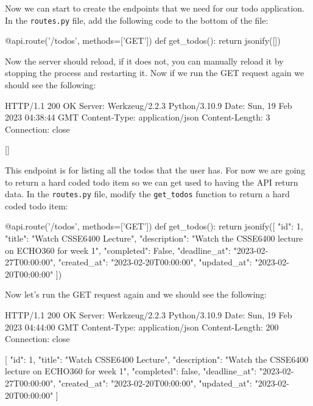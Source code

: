 \documentclass{csse4400}
\begin{document}
Now we can start to create the endpoints that we need for our todo application. In the \texttt{routes.py} file, add the following code to the bottom of the file:

\begin{code}[language=python]{}
  @api.route('/todos', methods=['GET'])
  def get_todos():
      return jsonify([])
\end{code}

Now the server should reload, if it does not, you can manually reload it by stopping the process and restarting it. Now if we run the GET request again we should see the following:

\begin{code}[language=json,numbers=none]{}
  HTTP/1.1 200 OK
  Server: Werkzeug/2.2.3 Python/3.10.9
  Date: Sun, 19 Feb 2023 04:38:44 GMT
  Content-Type: application/json
  Content-Length: 3
  Connection: close
  
  []
\end{code}

This endpoint is for listing all the todos that the user has. For now we are going to return a hard coded todo item so we can get used to having the API return data. In the \texttt{routes.py} file, modify the \texttt{get\_todos} function to return a hard coded todo item:

\begin{code}[language=python]{}
  @api.route('/todos', methods=['GET'])
  def get_todos():
      return jsonify([{
        "id": 1,
        "title": "Watch CSSE6400 Lecture",
        "description": "Watch the CSSE6400 lecture on ECHO360 for week 1",
        "completed": False,
        "deadline_at": "2023-02-27T00:00:00",
        "created_at": "2023-02-20T00:00:00",
        "updated_at": "2023-02-20T00:00:00"
      }])
\end{code}

Now let's run the GET request again and we should see the following:

\begin{code}[language=json,numbers=none]{}
  HTTP/1.1 200 OK
  Server: Werkzeug/2.2.3 Python/3.10.9
  Date: Sun, 19 Feb 2023 04:44:00 GMT
  Content-Type: application/json
  Content-Length: 200
  Connection: close
  
  [
    {
      "id": 1,
      "title": "Watch CSSE6400 Lecture",
      "description": "Watch the CSSE6400 lecture on ECHO360 for week 1",
      "completed": false,
      "deadline_at": "2023-02-27T00:00:00",
      "created_at": "2023-02-20T00:00:00",
      "updated_at": "2023-02-20T00:00:00"
    }
  ]
\end{code}
\end{document}
